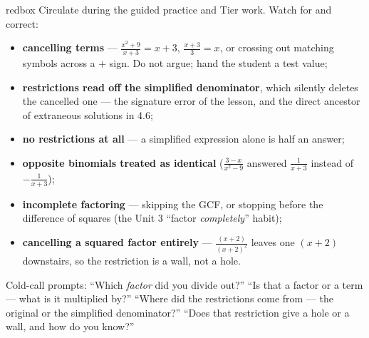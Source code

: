 \documentclass[10pt]{article}
\begin{document}
\begin{skillbox}{redbox}
Circulate during the guided practice and Tier work. Watch for and correct:
\begin{itemize}[leftmargin=1.2em, nosep]
  \item \textbf{cancelling terms} --- $\frac{x^2+9}{x+3}=x+3$, $\frac{x+3}{3}=x$, or crossing out matching symbols across a $+$ sign. Do not argue; hand the student a test value;
  \item \textbf{restrictions read off the simplified denominator}, which silently deletes the cancelled one --- the signature error of the lesson, and the direct ancestor of extraneous solutions in 4.6;
  \item \textbf{no restrictions at all} --- a simplified expression alone is half an answer;
  \item \textbf{opposite binomials treated as identical} ($\frac{3-x}{x^2-9}$ answered $\frac{1}{x+3}$ instead of $-\frac{1}{x+3}$);
  \item \textbf{incomplete factoring} --- skipping the GCF, or stopping before the difference of squares (the Unit 3 ``factor \emph{completely}'' habit);
  \item \textbf{cancelling a squared factor entirely} --- $\frac{(x+2)}{(x+2)^2}$ leaves one $(x+2)$ downstairs, so the restriction is a wall, not a hole.
\end{itemize}
Cold-call prompts: ``Which \emph{factor} did you divide out?'' ``Is that a factor or a term --- what is
it multiplied by?'' ``Where did the restrictions come from --- the original or the simplified
denominator?'' ``Does that restriction give a hole or a wall, and how do you know?''
\end{skillbox}
\end{document}
